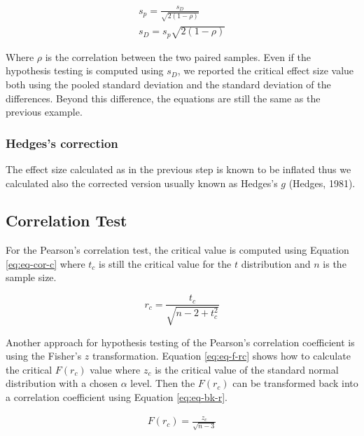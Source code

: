 \documentclass[
  man]{apa7}
\begin{document}
\begin{equation}
    \label{eq:eq-sp-sd}
    \begin{gathered}
        s_p =  \frac{s_D}{\sqrt{2(1 - \rho)}} \\
        s_D =  s_p \sqrt{2(1 - \rho)}
    \end{gathered}
\end{equation}

Where \(\rho\) is the correlation between the two paired samples. Even if the hypothesis testing is computed using \(s_D\), we reported the critical effect size value both using the pooled standard deviation and the standard deviation of the differences. Beyond this difference, the equations are still the same as the previous example.

\subsubsection{Hedges's correction}\label{hedgess-correction}

The effect size calculated as in the previous step is known to be inflated thus we calculated also the corrected version usually known as Hedges's \(g\) (Hedges, 1981).

\subsection{Correlation Test}\label{correlation-test}

For the Pearson's correlation test, the critical value is computed using Equation \eqref{eq:eq-cor-c} where \(t_c\) is still the critical value for the \(t\) distribution and \(n\) is the sample size.

\begin{equation}
    \label{eq:eq-cor-c}
    r_c = \frac{t_c}{\sqrt{n - 2 + t_c^2}}
\end{equation}

Another approach for hypothesis testing of the Pearson's correlation coefficient is using the Fisher's \(z\) transformation. Equation \eqref{eq:eq-f-rc} shows how to calculate the critical \(F(r_c)\) value where \(z_c\) is the critical value of the standard normal distribution with a chosen \(\alpha\) level. Then the \(F(r_c)\) can be transformed back into a correlation coefficient using Equation \eqref{eq:eq-bk-r}.

\begin{equation}
    \label{eq:eq-f-rc}
    \begin{gathered}
        F(r_c) = \frac{z_c}{\sqrt{n - 3}}
    \end{gathered}
\end{equation}
\end{document}

